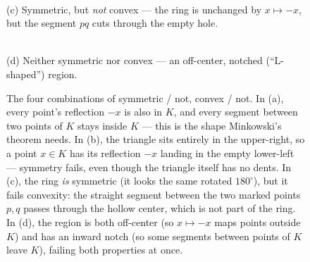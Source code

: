 \begin{figure}[ht]
\begin{minipage}[t]{0.47\textwidth}
\centering
{}\\[2pt]
{\small (c) Symmetric, but \emph{not} convex --- the ring is unchanged by $x\mapsto -x$, but the segment $pq$ cuts through the empty hole.}
\end{minipage}%
\hfill
\begin{minipage}[t]{0.47\textwidth}
\centering
{}\\[2pt]
{\small (d) Neither symmetric nor convex --- an off-center, notched (``L-shaped'') region.}
\end{minipage}
\caption{The four combinations of symmetric / not, convex / not. In (a), every point's reflection $-x$ is also in $K$, and every segment between two points of $K$ stays inside $K$ --- this is the shape Minkowski's theorem needs. In (b), the triangle sits entirely in the upper-right, so a point $x\in K$ has its reflection $-x$ landing in the empty lower-left --- symmetry fails, even though the triangle itself has no dents. In (c), the ring \emph{is} symmetric (it looks the same rotated $180^\circ$), but it fails convexity: the straight segment between the two marked points $p,q$ passes through the hollow center, which is not part of the ring. In (d), the region is both off-center (so $x\mapsto -x$ maps points outside $K$) and has an inward notch (so some segments between points of $K$ leave $K$), failing both properties at once.}
\label{fig:sym-convex-examples}
\end{figure}

